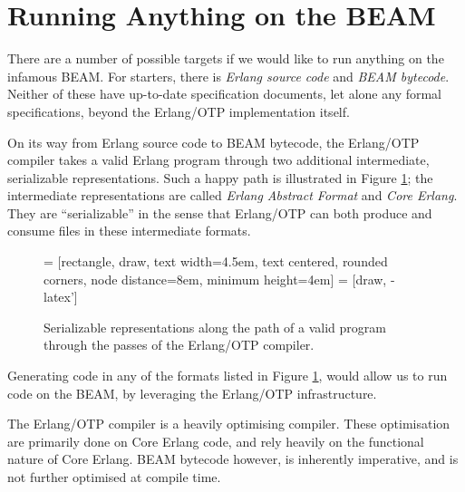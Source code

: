 \section{Running Anything on the BEAM}

There are a number of possible targets if we would like to run
anything on the infamous BEAM. For starters, there is \emph{Erlang
source code} and \emph{BEAM bytecode}. Neither of these have
up-to-date specification documents\footnotemark, let alone any formal
specifications, beyond the Erlang/OTP implementation itself.


On its way from Erlang source code to BEAM bytecode, the Erlang/OTP
compiler takes a valid Erlang program through two additional
intermediate, serializable representations. Such a happy path is
illustrated in Figure \ref{fig:serializable-representations}; the
intermediate representations are called \emph{Erlang Abstract Format}
and \emph{Core Erlang}.  They are ``serializable'' in the sense that
Erlang/OTP can both produce and consume files in these intermediate
formats.
 
\begin{figure}[h]
\centering
{} = [rectangle, draw, 
    text width=4.5em, text centered, rounded corners,
    node distance=8em,
    minimum height=4em]
 = [draw, -latex']


\caption{Serializable representations along the path of a valid
program through the passes of the Erlang/OTP compiler.}

\label{fig:serializable-representations}
\end{figure}

Generating code in any of the formats listed in Figure
\ref{fig:serializable-representations}, would allow us to run code on
the BEAM, by leveraging the Erlang/OTP infrastructure.

The Erlang/OTP compiler is a heavily optimising compiler. These
optimisation are primarily done on Core Erlang code, and rely heavily
on the functional nature of Core Erlang. BEAM bytecode however, is
inherently imperative, and is not further optimised at compile time.


